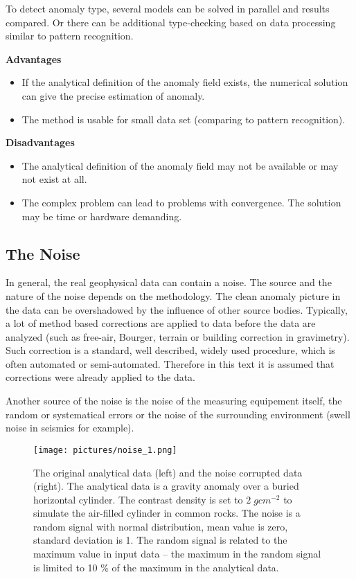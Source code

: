 \documentclass[FM]{tulthesis}
\begin{document}
To detect anomaly type, several models can be solved in parallel and results compared. Or there can be additional type-checking based on data processing similar to pattern recognition. 

\textbf{Advantages}

\begin{itemize}

\item If the analytical definition of the anomaly field exists, the numerical solution can give the precise estimation of anomaly.

\item The method is usable for small data set (comparing to pattern recognition).

\end{itemize}

\textbf{Disadvantages}

\begin{itemize}

\item The analytical definition of the anomaly field may not be available or may not exist at all. 

\item The complex problem can lead to problems with convergence. The solution may be time or hardware demanding.

\end{itemize}


\subsection{The Noise}\label{sec:Noise}
In general, the real geophysical data can contain a noise. The source and the nature of the noise depends on the methodology. The clean anomaly picture in the data can be overshadowed by the influence of other source bodies. Typically, a lot of method based corrections are applied to data before the data are analyzed (such as free-air, Bourger, terrain or building correction in gravimetry). Such correction is a standard, well described, widely used procedure, which is often automated or semi-automated. Therefore in this text it is assumed that corrections were already applied to the data.

Another source of the noise is the noise of the measuring equipement itself, the random or systematical errors or the noise of the surrounding environment (swell noise in seismics for example).

\begin{figure}[ht]
\renewcommand{\figurename}{Figure}
\centerline{\texttt{[image: pictures/noise\_1.png]}}
\caption[Noise elimination - input data]{The original analytical data (left) and the noise corrupted data (right). The analytical data is a gravity anomaly over a buried horizontal cylinder. The contrast density is set to $2\;gcm^{-2}$ to simulate the air-filled cylinder in common rocks. The noise is a random signal with normal distribution, mean value is zero, standard deviation is 1. The random signal is related to the maximum value in input data – the maximum in the random signal is limited to 10 \% of the maximum in the analytical data.}
\label{fig:NoiseInput}
\end{figure}
\end{document}
